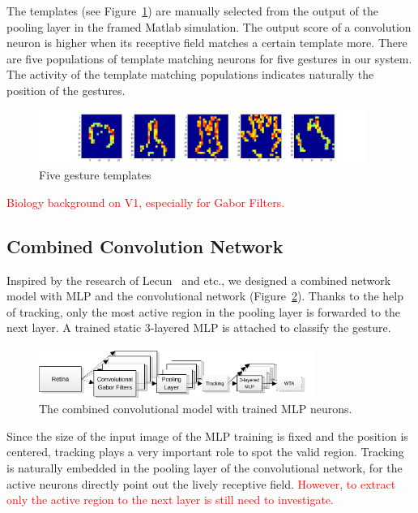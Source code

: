 The templates (see Figure~\ref{fig:template}) are manually selected from the output of the pooling layer in the framed Matlab simulation. 
The output score of a convolution neuron is higher when its receptive field matches a certain template more. 
There are five populations of template matching neurons for five gestures in our system. 
The activity of the template matching populations indicates naturally the position of the gestures.

\begin{figure}
\centering
	\includegraphics[width=0.95\textwidth]{pics/guesture.png}
	\caption{Five gesture templates}
	\label{fig:template}
\end{figure}

\textcolor{red}{Biology background on V1, especially for Gabor Filters.}

\subsection{Combined Convolution Network}
Inspired by the research of Lecun~\cite{lecun1998gradient} and etc., we designed a combined network model with MLP and the convolutional network (Figure~\ref{fig:model2}). 
Thanks to the help of tracking, only the most active region in the pooling layer is forwarded to the next layer. 
A trained static 3-layered MLP is attached to classify the gesture.

\begin{figure}
\centering
	\includegraphics[width=0.8\textwidth]{pics/model2.pdf}
	\caption{The combined convolutional model with trained MLP neurons.}
	\label{fig:model2}
\end{figure}

Since the size of the input image of the MLP training is fixed and the position is centered, tracking plays a very important role to spot the valid region. 
Tracking is naturally embedded in the pooling layer of the convolutional network, for the active neurons directly point out the lively receptive field. 
\textcolor{red}{However, to extract only the active region to the next layer is still need to investigate.}

